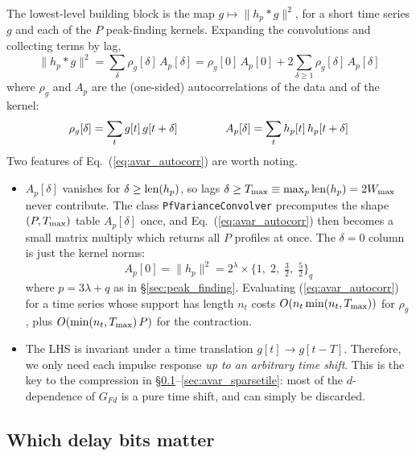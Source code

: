 \documentclass{article}
\numberwithin{equation}{section}   %
\begin{document}
The lowest-level building block is the map $g \mapsto \|h_p * g\|^2$, for a short time series $g$
and each of the $P$ peak-finding kernels. Expanding the convolutions and collecting terms by lag,
\begin{equation}
\big\| h_p * g \big\|^2 = \sum_{\delta} \rho_g[\delta] \, A_p[\delta]
  = \rho_g[0] \, A_p[0] + 2 \sum_{\delta \ge 1} \rho_g[\delta] \, A_p[\delta]
  \label{eq:avar_autocorr}
\end{equation}
where $\rho_g$ and $A_p$ are the (one-sided) autocorrelations of the data and of the kernel:
\begin{equation}
\rho_g[\delta] = \sum_t g[t] \, g[t+\delta]
  \hspace{1.5cm}
A_p[\delta] = \sum_t h_p[t] \, h_p[t+\delta]
\end{equation}
Two features of Eq.\ (\ref{eq:avar_autocorr}) are worth noting.
\begin{itemize}
\item $A_p[\delta]$ vanishes for $\delta \ge {\rm len}(h_p)$, so lags
$\delta \ge T_{\rm max} \equiv \max_p {\rm len}(h_p) = 2 W_{\rm max}$ never contribute.
The class \verb|PfVarianceConvolver| precomputes the shape $(P,T_{\rm max})$ table $A_p[\delta]$
once, and Eq.\ (\ref{eq:avar_autocorr}) then becomes a small matrix multiply which returns all $P$
profiles at once. The $\delta=0$ column is just the kernel norms:
\begin{equation}
A_p[0] = \|h_p\|^2 = 2^\lambda \times \big\{ 1, \; 2, \; \tfrac{3}{2}, \; \tfrac{5}{2} \big\}_q
\end{equation}
where $p = 3\lambda + q$ as in \S\ref{sec:peak_finding}.
Evaluating (\ref{eq:avar_autocorr}) for a time series whose support has length $n_t$ costs
$O(n_t \min(n_t, T_{\rm max}))$ for $\rho_g$, plus $O(\min(n_t,T_{\rm max}) \, P)$ for the
contraction.

\item The LHS is invariant under a time translation $g[t] \rightarrow g[t-T]$. Therefore, we only
need each impulse response {\em up to an arbitrary time shift}. This is the key to the
compression in \S\ref{sec:avar_dbits}--\ref{sec:avar_sparsetile}: most of the $d$-dependence of
$G_{Fd}$ is a pure time shift, and can simply be discarded.
\end{itemize}

\subsection{Which delay bits matter}
\label{sec:avar_dbits}
\end{document}
